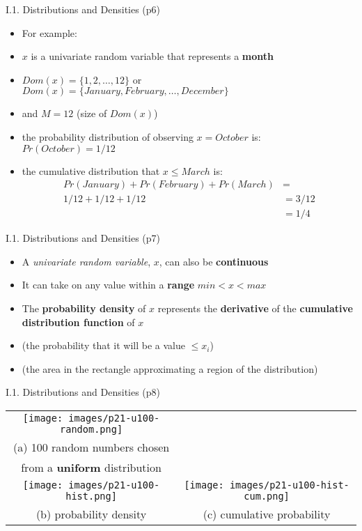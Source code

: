 \documentclass[handout]{beamer}
\newcommand{\strong}[1]{\textbf{\color{teal} #1}}
\newcommand{\stronger}[1]{\textbf{\color{purple} #1}}
\begin{document}
\begin{frame}{I.1. Distributions and Densities (p6)}
\begin{itemize}
\item[] For example:
\item $x$ is a univariate random variable that represents a \textbf{month}
\item $Dom(x) = \{1, 2, \ldots, 12\}$ or \\
	$Dom(x) = \{January, February, \ldots, December \}$
\item[] and $M = 12$ (size of $Dom(x)$) 
\item the probability distribution of observing $x=October$ is: $Pr(October) = 1/12$
\item the cumulative distribution that $x \le March$ is:
\[
\begin{array}{rl}
	Pr(January) + Pr(February) + Pr(March) & = \\
	1/12 + 1/12 + 1/12 & = 3/12 \\
	& = 1/4
\end{array}
\]
\end{itemize}
\end{frame}
\begin{frame}{I.1. Distributions and Densities (p7)}
\begin{itemize}
\item A \emph{univariate random variable}, $x$, can also be \strong{continuous}
\item It can take on any value within a \stronger{range}
$min < x < max$
\item The \stronger{probability density} of $x$ represents the \textbf{derivative} of the \strong{cumulative distribution function} of $x$
\item[] (the probability that it will be a value $\le x_i$)
\item[] (the area in the rectangle approximating a region of the distribution)
\end{itemize}
\end{frame}
\begin{frame}{I.1. Distributions and Densities (p8)}
\begin{center}
\begin{tabular}{cc}
\texttt{[image: images/p21-u100-random.png]} \\
(a) 100 random numbers chosen \\
from a \strong{uniform} distribution \\
\texttt{[image: images/p21-u100-hist.png]} &
\texttt{[image: images/p21-u100-hist-cum.png]} \\
(b) probability density & (c) cumulative probability \\
\end{tabular}
\end{center}
\end{frame}
\end{document}
